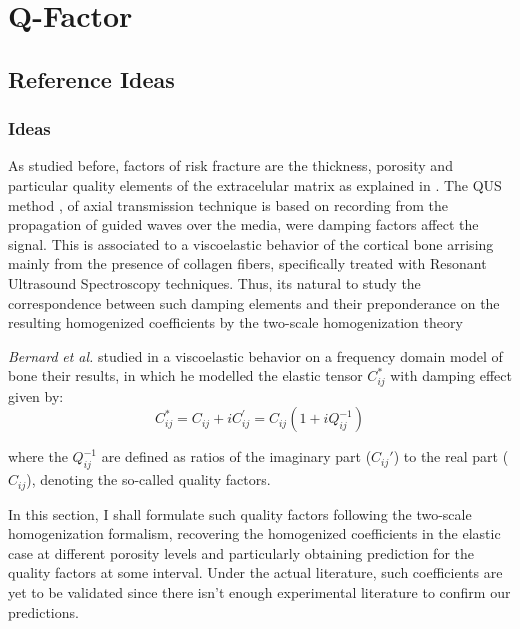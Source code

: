 \chapter{Q-Factor}
\section{Reference Ideas}



\subsection{Ideas}
As studied before, factors of risk fracture are the thickness, porosity and particular quality elements of the extracelular matrix as explained in \cite{Bernard2015}. The QUS method \cite{Foiret2014}, \cite{Minonzio2018} of axial transmission technique is based on recording from the propagation of guided waves over the media, were damping factors affect the signal. This is associated to a viscoelastic behavior of the cortical bone arrising mainly from the presence of collagen fibers, specifically treated with Resonant Ultrasound Spectroscopy techniques. Thus, its natural to study the correspondence between such damping elements and their preponderance on the resulting homogenized coefficients by the two-scale homogenization theory

\textit{Bernard} \textit{et al. }\cite{Bernard2015} studied in a viscoelastic behavior on a frequency domain model of bone their results, in which he modelled the elastic tensor $C^*_{ij}$ with damping effect given by:
\begin{equation*}
C^*_{ij} = C_{ij} + i C_{ij}^{'} = C_{ij} (1+ iQ_{ij}^{-1})
\end{equation*}

where the $Q^{-1}_{ij}$ are defined as ratios of the imaginary part ($C_{ij}'$) to the real part ($C_{ij}$), denoting the so-called quality factors.

In this section, I shall formulate such quality factors following the two-scale homogenization formalism, recovering the homogenized coefficients in the elastic case at different porosity levels and particularly obtaining prediction for the quality factors at some interval. Under the actual literature, such coefficients are yet to be validated since there isn't enough experimental literature to confirm our predictions.


